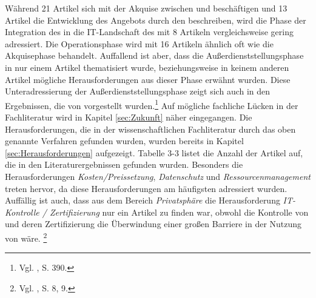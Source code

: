 Während 21 Artikel sich mit der Akquise zwischen \CSUn und \CSPn beschäftigen und 13 Artikel die Entwicklung des \CC Angebots durch den \CSP beschreiben, wird die Phase der Integration des \CSs in die IT-Landschaft des \CSUs mit 8 Artikeln vergleichsweise gering adressiert. Die Operationsphase wird mit 16 Artikeln ähnlich oft wie die Akquisephase behandelt. Auffallend ist aber, dass die Außerdienststellungsphase in nur einem Artikel thematisiert wurde, beziehungsweise in keinem anderen Artikel mögliche Herausforderungen aus dieser Phase erwähnt wurden.
Diese Unteradressierung der Außerdienststellungsphase zeigt sich auch in den Ergebnissen, die von \cite{Esteves.2007} vorgestellt wurden.\footnote{Vgl. \cite{Esteves.2007}, S. 390.}
Auf mögliche fachliche Lücken in der Fachliteratur wird in Kapitel \ref{sec:Zukunft} näher eingegangen.
\newline
Die Herausforderungen, die in der wissenschaftlichen Fachliteratur durch das oben genannte Verfahren gefunden wurden, wurden bereits in Kapitel \ref{sec:Herausforderungen} aufgezeigt. Tabelle 3-3 listet die Anzahl der Artikel auf, die in den Literaturergebnissen gefunden wurden.
\newline
Besonders die Herausforderungen \emph{Kosten/Preissetzung}, \emph{Datenschutz} und \emph{Ressourcenmanagement} treten hervor, da diese Herausforderungen am häufigsten adressiert wurden.
Auffällig ist auch, dass aus dem Bereich \emph{Privatsphäre} die Herausforderung \emph{IT-Kontrolle / Zertifizierung} nur ein Artikel zu finden war, obwohl die Kontrolle von \CSs und deren Zertifizierung die Überwindung einer großen Barriere in der Nutzung von \CC wäre. \footnote{Vgl. \cite{Praeg.2006}, S. 8, 9.} 
